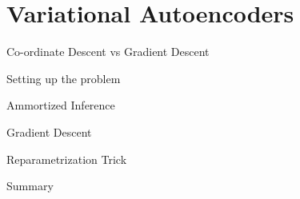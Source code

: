 \section*{Variational Autoencoders}
\begin{frame}{Co-ordinate Descent vs Gradient Descent}

\end{frame}

\begin{frame}{Setting up the problem}
    
\end{frame}

\begin{frame}{Ammortized Inference}

\end{frame}

\begin{frame}{Gradient Descent}

\end{frame}

\begin{frame}{Reparametrization Trick}

\end{frame}

\begin{frame}{Summary}

\end{frame}